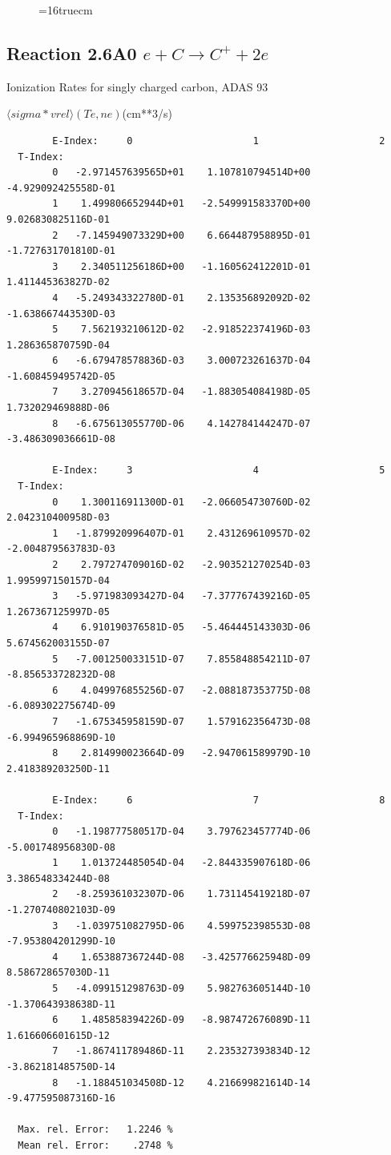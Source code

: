 \documentclass[12pt,dvips]{article}
\begin{document}
\begin{figure} \label{2.2C}
\epsfxsize=16truecm
\end{figure}
\newpage


\subsection{
Reaction 2.6A0 $e + C \rightarrow C^+  + 2e $
}
  Ionization Rates for singly charged carbon,
  ADAS 93

$  \langle sigma*vrel \rangle(Te,ne) $(cm**3/s)
\begin{small}\begin{verbatim}
        E-Index:     0                     1                     2
  T-Index:
        0   -2.971457639565D+01    1.107810794514D+00   -4.929092425558D-01
        1    1.499806652944D+01   -2.549991583370D+00    9.026830825116D-01
        2   -7.145949073329D+00    6.664487958895D-01   -1.727631701810D-01
        3    2.340511256186D+00   -1.160562412201D-01    1.411445363827D-02
        4   -5.249343322780D-01    2.135356892092D-02   -1.638667443530D-03
        5    7.562193210612D-02   -2.918522374196D-03    1.286365870759D-04
        6   -6.679478578836D-03    3.000723261637D-04   -1.608459495742D-05
        7    3.270945618657D-04   -1.883054084198D-05    1.732029469888D-06
        8   -6.675613055770D-06    4.142784144247D-07   -3.486309036661D-08

        E-Index:     3                     4                     5
  T-Index:
        0    1.300116911300D-01   -2.066054730760D-02    2.042310400958D-03
        1   -1.879920996407D-01    2.431269610957D-02   -2.004879563783D-03
        2    2.797274709016D-02   -2.903521270254D-03    1.995997150157D-04
        3   -5.971983093427D-04   -7.377767439216D-05    1.267367125997D-05
        4    6.910190376581D-05   -5.464445143303D-06    5.674562003155D-07
        5   -7.001250033151D-07    7.855848854211D-07   -8.856533728232D-08
        6    4.049976855256D-07   -2.088187353775D-08   -6.089302275674D-09
        7   -1.675345958159D-07    1.579162356473D-08   -6.994965968869D-10
        8    2.814990023664D-09   -2.947061589979D-10    2.418389203250D-11

        E-Index:     6                     7                     8
  T-Index:
        0   -1.198777580517D-04    3.797623457774D-06   -5.001748956830D-08
        1    1.013724485054D-04   -2.844335907618D-06    3.386548334244D-08
        2   -8.259361032307D-06    1.731145419218D-07   -1.270740802103D-09
        3   -1.039751082795D-06    4.599752398553D-08   -7.953804201299D-10
        4    1.653887367244D-08   -3.425776625948D-09    8.586728657030D-11
        5   -4.099151298763D-09    5.982763605144D-10   -1.370643938638D-11
        6    1.485858394226D-09   -8.987472676089D-11    1.616606601615D-12
        7   -1.867411789486D-11    2.235327393834D-12   -3.862181485750D-14
        8   -1.188451034508D-12    4.216699821614D-14   -9.477595087316D-16

  Max. rel. Error:   1.2246 %
  Mean rel. Error:    .2748 %
\end{verbatim}\end{small}
\end{document}
